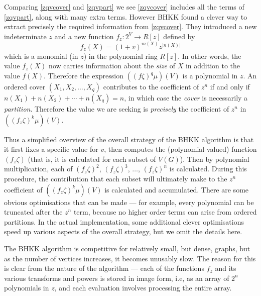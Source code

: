 Comparing \eqref{zqvcover} and \eqref{zqvpart} we see \eqref{zqvcover} includes all the terms of \eqref{zqvpart}, along with many extra terms. However BHKK found a clever way to extract precisely the required information from \eqref{zqvcover}. They introduced a new indeterminate $z$ and a new function $f_z: 2^V \rightarrow R[z]$ defined by 
\[
f_z(X) = (1+v)^{m(X)} z^{|n(X)|}
\]
which is a monomial (in $z$) in the polynomial ring $R[z]$. In other words, the value  $f_z(X)$ now carries information about the {\em size} of $X$ in addition to the value $f(X)$. Therefore the expression $\left( (f\zeta)^q \mu \right) (V)$ is a polynomial in $z$. An ordered cover $(X_1, X_2, \ldots, X_q)$ contributes to the coefficient of $z^n$ if and only if $n(X_1) + n(X_2) + \cdots + n(X_q) = n$, in which case the {\em cover} is necessarily a {\em partition}. Therefore the value we are seeking is {\em precisely} the coefficient of $z^n$ in $((f_z \zeta)^k \mu) (V)$.

Thus a simplified overview of the overall strategy of the BHKK algorithm is that it first fixes a specific value for $v$, then computes the (polynomial-valued) function $(f_z \zeta)$ (that is, it is calculated for each subset of $V(G)$). Then by polynomial multiplication, each of $(f_z \zeta)^2$, $(f_z \zeta)^3$, $\ldots$, $(f_z \zeta)^n$ is calculated. During this procedure, the contribution that each subset will ultimately make to the $z^n$ coefficient of $((f_z \zeta)^k \mu) (V)$ is calculated
and accumulated. There are some obvious optimisations that can be made --- for example, every polynomial can be truncated after the $z^n$ term, because no higher order terms can arise from ordered partitions. In the actual implementation, some additional clever optimisations speed up various aspects of the overall strategy, but we omit the details here.

The BHKK algorithm is competitive for relatively small, but dense, graphs, but as the number of vertices increases, it becomes unusably slow. The reason for this is clear from the nature of the algorithm --- each of the functions $f_z$ and its various transforms and powers is stored in image form, i.e, as an array of $2^n$ polynomials in $z$, and each evaluation involves processing the entire array.

